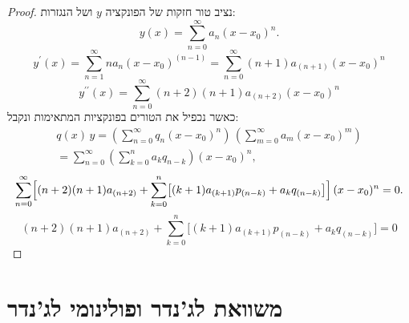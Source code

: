 \documentclass{tstextbook}
\begin{document}
\begin{proof}
נציב טור חזקות של הפונקציה \(y\) ושל הנגזרות:
$$y(x)=\sum_{n=0}^{\infty}a_{n}\left(x-x_{0}\right)^{n}.$$$$y^{\prime}(x)=\sum_{n=1}^{\infty}n a_{n}\left(x-x_{0}\right)^{(n-1)}=\sum_{n=0}^{\infty}(n+1)a_{(n+1)}\left(x-x_{0}\right)^{n}$$$$y^{\prime\prime}(x)=\sum_{n=0}^{\infty}(n+2)(n+1)a_{(n+2)}\left(x-x_{0}\right)^{n}$$
כאשר נכפיל את הטורים בפונקציות המתאימות ונקבל:
$$\begin{array}{c}{{q(x)\,y=\left(\sum_{n=0}^{\infty}q_{n}(x-x_{0})^{n}\right)\,\left(\sum_{m=0}^{\infty}a_{m}(x-x_{0})^{m}\right)}}\\ {{=\sum_{n=0}^{\infty}\left(\sum_{k=0}^{n}a_{k}q_{n-k}\right)(x-x_{0})^{n},}}\end{array}$$$$\sum_{n=0}^{\infty}\Bigl[(n+2)(n+1)a_{(n+2)}+\sum_{k=0}^{n}\bigl[(k+1)a_{(k+1)}p_{(n-k)}+a_{k}q_{(n-k)}\bigr]\Bigr]\,(x-x_{0})^{n}=0.$$$$(n+2)(n+1)a_{(n+2)}+\sum_{k=0}^{n}\bigl[(k+1)a_{(k+1)}p_{(n-k)}+a_{k}q_{(n-k)}\bigr]=0$$

\end{proof}
\section{משוואת לג'נדר ופולינומי לג'נדר}
\end{document}
